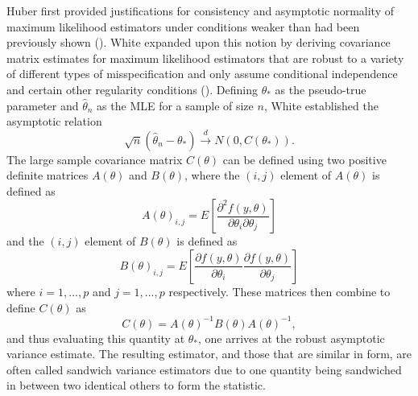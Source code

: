 \documentclass[12pt]{article} %
\theoremstyle{definition}
\begin{document}
		Huber first provided justifications for consistency and asymptotic normality of maximum likelihood estimators under conditions weaker than had been previously shown (\cite{Huber}). White
		expanded upon this notion by deriving covariance matrix estimates for maximum likelihood estimators that are robust to a variety of different types of misspecification and only assume
		conditional independence and certain other regularity conditions (\cite{White1982}). Defining $\theta_*$ as the pseudo-true parameter and $\hat{\theta}_n$ as the MLE for a sample of size
		$n$, White established the asymptotic relation
		\begin{equation*}
			\sqrt{n} (\hat{\theta}_n - \theta_*) \xrightarrow[]{d} N(0, C(\theta_* ) ) .
		\end{equation*}
		The large sample covariance matrix $C(\theta)$ can be defined using two positive definite matrices $A(\theta)$ and $B(\theta)$, where the $(i,j)$ element of $A(\theta)$ is defined as
		\begin{equation*}
			A(\theta)_{i,j} = E \left[ \frac{\partial^2 f(y,\theta)}{\partial \theta_i \partial \theta_j} \right] 
		\end{equation*}
		and the $(i,j)$ element of $B(\theta)$ is defined as
		\begin{equation*}
			B(\theta)_{i,j} = E \left[ \frac{\partial f(y,\theta)}{\partial \theta_i} \frac{\partial f(y,\theta)}{\partial \theta_j} \right] 
		\end{equation*}
		where $i = 1,...,p$ and $j = 1,...,p$ respectively. These matrices then combine to define $C(\theta)$ as
		\begin{equation*}
			C(\theta) = A(\theta)^{-1} B(\theta) A(\theta)^{-1} ,
		\end{equation*}
		and thus evaluating this quantity at $\theta_*$, one arrives at the robust asymptotic variance estimate. The resulting estimator, and those that are similar in form, are often called sandwich
		variance estimators due to one quantity being sandwiched in between two identical others to form the statistic.
\end{document}

